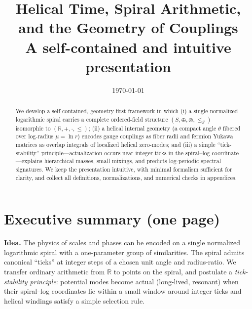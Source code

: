 \documentclass[11pt]{article}
\title{\textbf{Helical Time, Spiral Arithmetic, and the Geometry of Couplings}\\[4pt]
\large A self-contained and intuitive presentation}
\author{}
\date{\today}
\newcommand{\R}{\mathbb{R}}
\begin{document}
\maketitle

\begin{abstract}
We develop a self-contained, geometry-first framework in which
(i) a single normalized logarithmic spiral carries a complete ordered-field structure \((S,\oplus,\otimes,\le_S)\) isomorphic to \((\R,+,\cdot,\le)\);
(ii) a helical internal geometry (a compact angle \(\theta\) fibered over log-radius \(\mu=\ln r\)) encodes gauge couplings as fiber radii and fermion Yukawa matrices as overlap integrals of localized helical zero-modes; and
(iii) a simple ``tick-stability'' principle---actualization occurs near integer ticks in the spiral--log coordinate---explains hierarchical masses, small mixings, and predicts log-periodic spectral signatures.
We keep the presentation intuitive, with minimal formalism sufficient for clarity, and collect all definitions, normalizations, and numerical checks in appendices.
\end{abstract}

\tableofcontents

\section{Executive summary (one page)}
\textbf{Idea.} The physics of scales and phases can be encoded on a single normalized logarithmic spiral with a one-parameter group of similarities.
The spiral admits canonical ``ticks'' at integer steps of a chosen unit angle and radius-ratio.
We transfer ordinary arithmetic from \(\R\) to points on the spiral, and postulate a \emph{tick-stability principle}: potential modes become actual (long-lived, resonant) when their spiral--log coordinates lie within a small window around integer ticks and helical windings satisfy a simple selection rule.
\end{document}
